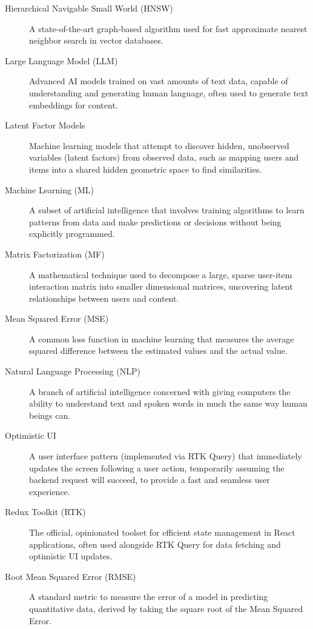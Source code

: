 \documentclass[12pt,a4paper]{report}
\begin{document}
\begin{description}
\item[Hierarchical Navigable Small World (HNSW)] A state-of-the-art graph-based algorithm used for fast approximate nearest neighbor search in vector databases.

\item[Large Language Model (LLM)] Advanced AI models trained on vast amounts of text data, capable of understanding and generating human language, often used to generate text embeddings for content.

\item[Latent Factor Models] Machine learning models that attempt to discover hidden, unobserved variables (latent factors) from observed data, such as mapping users and items into a shared hidden geometric space to find similarities.

\item[Machine Learning (ML)] A subset of artificial intelligence that involves training algorithms to learn patterns from data and make predictions or decisions without being explicitly programmed.

\item[Matrix Factorization (MF)] A mathematical technique used to decompose a large, sparse user-item interaction matrix into smaller dimensional matrices, uncovering latent relationships between users and content.

\item[Mean Squared Error (MSE)] A common loss function in machine learning that measures the average squared difference between the estimated values and the actual value.

\item[Natural Language Processing (NLP)] A branch of artificial intelligence concerned with giving computers the ability to understand text and spoken words in much the same way human beings can.

\item[Optimistic UI] A user interface pattern (implemented via RTK Query) that immediately updates the screen following a user action, temporarily assuming the backend request will succeed, to provide a fast and seamless user experience.

\item[Redux Toolkit (RTK)] The official, opinionated toolset for efficient state management in React applications, often used alongside RTK Query for data fetching and optimistic UI updates.

\item[Root Mean Squared Error (RMSE)] A standard metric to measure the error of a model in predicting quantitative data, derived by taking the square root of the Mean Squared Error.


\end{description}
\end{document}
